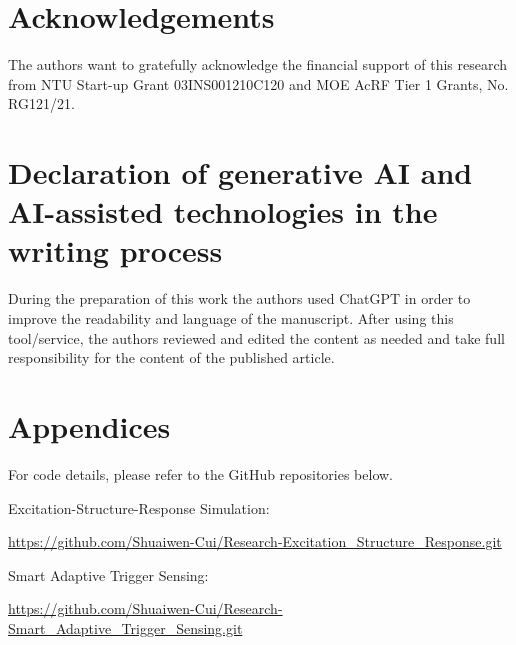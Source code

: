 \documentclass[a4paper,fleqn,numbers,sort&compress]{cas-sc}
\begin{document}
\section*{Acknowledgements}
\label{sec:acknowledgements}

The authors want to gratefully acknowledge the financial support of this research from NTU Start-up Grant 03INS001210C120 and MOE AcRF Tier 1 Grants, No. RG121/21.

\section*{Declaration of generative AI and AI-assisted technologies in the writing process}
\label{sec:declaration}
During the preparation of this work the authors used ChatGPT in order to improve the readability and language of the manuscript. After using this tool/service, the authors reviewed and edited the content as needed and take full responsibility for the content of the published article.

\section*{Appendices}

For code details, please refer to the GitHub repositories below.

Excitation-Structure-Response Simulation: 

\url{https://github.com/Shuaiwen-Cui/Research-Excitation_Structure_Response.git}

Smart Adaptive Trigger Sensing: 

\url{https://github.com/Shuaiwen-Cui/Research-Smart\_Adaptive\_Trigger\_Sensing.git}



\end{document}
